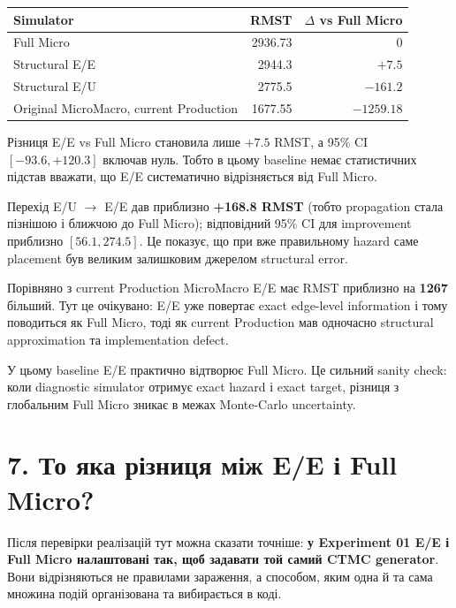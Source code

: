 \documentclass[11pt,a4paper]{article}
\begin{document}
\begin{center}
\begin{tabular}{l r r}
\toprule
\textbf{Simulator} & \textbf{RMST} & \textbf{$\Delta$ vs Full Micro}\\
\midrule
Full Micro & 2936.73 & 0\\
Structural E/E & 2944.3 & $+7.5$\\
Structural E/U & 2775.5 & $-161.2$\\
Original MicroMacro, current Production & 1677.55 & $-1259.18$\\
\bottomrule
\end{tabular}
\end{center}

Різниця E/E vs Full Micro становила лише $+7.5$ RMST, а 95\% CI $[-93.6,+120.3]$ включав нуль. Тобто в цьому baseline немає статистичних підстав вважати, що E/E систематично відрізняється від Full Micro.

Перехід E/U $\to$ E/E дав приблизно \textbf{+168.8 RMST} (тобто propagation стала пізнішою і ближчою до Full Micro); відповідний 95\% CI для improvement приблизно $[56.1,274.5]$. Це показує, що при вже правильному hazard саме placement був великим залишковим джерелом structural error.

Порівняно з current Production MicroMacro E/E має RMST приблизно на \textbf{1267} більший. Тут це очікувано: E/E уже повертає exact edge-level information і тому поводиться як Full Micro, тоді як current Production мав одночасно structural approximation та implementation defect.

\begin{tcolorbox}[colback=soft,colframe=exact,title=Головний результат E/E]
У цьому baseline E/E практично відтворює Full Micro. Це сильний sanity check: коли diagnostic simulator отримує exact hazard і exact target, різниця з глобальним Full Micro зникає в межах Monte-Carlo uncertainty.
\end{tcolorbox}

\section*{7. То яка різниця між E/E і Full Micro?}

Після перевірки реалізацій тут можна сказати точніше: \textbf{у Experiment 01 E/E і Full Micro налаштовані так, щоб задавати той самий CTMC generator}. Вони відрізняються не правилами зараження, а способом, яким одна й та сама множина подій організована та вибирається в коді.
\end{document}

